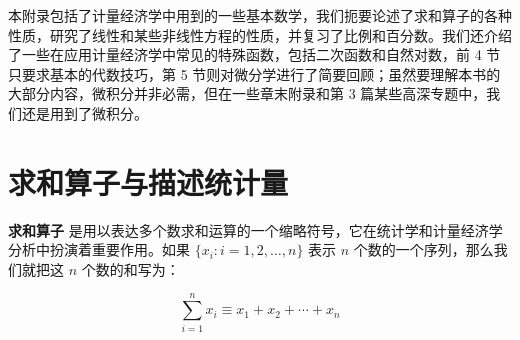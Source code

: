 \documentclass[lang=cn,newtx,10pt,scheme=chinese]{elegantbook}
\begin{document}
本附录包括了计量经济学中用到的一些基本数学，我们扼要论述了求和算子的各种性质，研究了线性和某些非线性方程的性质，并复习了比例和百分数。我们还介绍了一些在应用计量经济学中常见的特殊函数，包括二次函数和自然对数，前 4 节只要求基本的代数技巧，第 5 节则对微分学进行了简要回顾；虽然要理解本书的大部分内容，微积分并非必需，但在一些章末附录和第 3 篇某些高深专题中，我们还是用到了微积分。

\section{求和算子与描述统计量}

\textbf{求和算子} 是用以表达多个数求和运算的一个缩略符号，它在统计学和计量经济学分析中扮演着重要作用。如果 $\{x_i: i=1, 2, \ldots, n\}$ 表示 $n$ 个数的一个序列，那么我们就把这 $n$ 个数的和写为：

\begin{equation}
\sum_{i=1}^n x_i \equiv x_1 + x_2 +\cdots + x_n
\end{equation}
\end{document}
